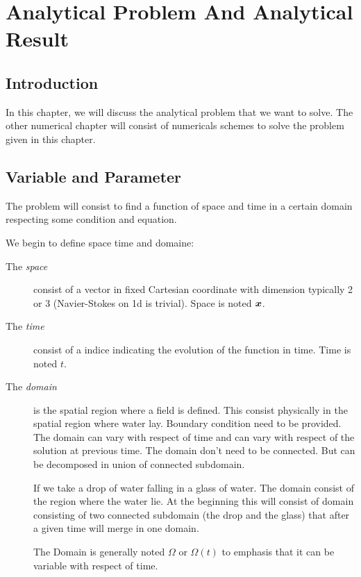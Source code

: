 \chapter{Analytical Problem And Analytical Result}

\minitoc
\section*{Introduction}
In this chapter, we will discuss the analytical problem that we want to solve.
The other numerical chapter will consist of numericals schemes to solve the problem given in this chapter.

\section{Variable and Parameter}

The problem will consist to find a function of space and time in a certain domain respecting some condition and equation.

We begin to define space time and domaine:
\begin{description}
\item[The \emph{space}] consist of a vector in fixed Cartesian coordinate with dimension typically 2 or 3 (Navier-Stokes on 1d is trivial).
Space is noted ${\boldsymbol {x}}$.
\item[The \emph{time}] consist of a indice indicating the evolution of the function in time.
Time is noted $t$.
\item[The \emph{domain}] is the spatial region where a field is defined. This consist physically in the spatial region where water lay.
Boundary condition need to be provided.
The domain can vary with respect of time and can vary with respect of the solution at previous time.
The domain don't need to be connected. But can be decomposed in union of connected subdomain.

\begin{example}
 If we take a drop of water falling in a glass of water. The domain consist of the region where the water lie.
 At the beginning this will consist of domain consisting of two connected subdomain (the drop and the glass)
 that after a given time will merge in one domain.
\end{example}

The Domain is generally noted $\Omega$ or $\Omega(t)$ to emphasis that it can be variable with respect of time.
\end{description}

